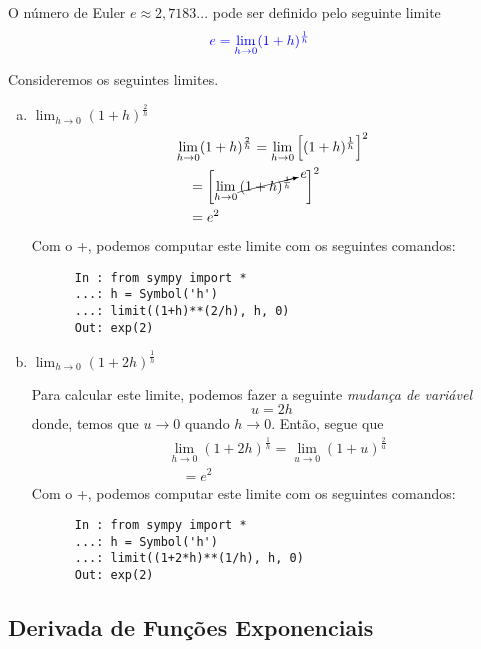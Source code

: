 O número de Euler $e\approx 2,7183...$ pode ser definido pelo seguinte limite
\begin{equation}\label{eq:defe}
  {\color{blue} e = \lim_{h\to 0}(1 + h)^{\frac{1}{h}}}
\end{equation}

\begin{ex}
  Consideremos os seguintes limites.
  \begin{enumerate}[a)]
  \item $\displaystyle\lim_{h\to 0} (1 + h)^{\frac{2}{h}}$
    \begin{align}
      & \lim_{h\to 0} (1 + h)^{\frac{2}{h}} = \lim_{h\to 0} \left[(1 + h)^{\frac{1}{h}}\right]^2\\
      & \text{}\quad = \left[\lim_{h\to 0}\cancelto{e}{(1 + h)^{\frac{1}{h}}}\quad\right]^2\\
      & \text{}\quad = e^2
    \end{align}
    \ifispython
    Com o {\python}+{\sympy}, podemos computar este limite com os seguintes comandos:
    \begin{lstlisting}
      In : from sympy import *
      ...: h = Symbol('h')
      ...: limit((1+h)**(2/h), h, 0)
      Out: exp(2)
    \end{lstlisting}
    \fi
  \item $\displaystyle \lim_{h\to 0}\left(1 + 2h\right)^{\frac{1}{h}}$
    
    Para calcular este limite, podemos fazer a seguinte \emph{mudança de variável}
    \begin{equation}
      u = 2h
    \end{equation}
    donde, temos que $u\to 0$ quando $h\to 0$. Então, segue que
    \begin{align}
      & \lim_{h\to 0}\left(1 + 2h\right)^{\frac{1}{h}} = \lim_{u\to 0}\left(1 + u\right)^{\frac{2}{u}}\\
      & \text{}\quad = e^2
    \end{align}
    \ifispython
    Com o {\python}+{\sympy}, podemos computar este limite com os seguintes comandos:
    \begin{lstlisting}
      In : from sympy import *
      ...: h = Symbol('h')
      ...: limit((1+2*h)**(1/h), h, 0)
      Out: exp(2)
    \end{lstlisting}
    \fi
  \end{enumerate}
\end{ex}

\subsection{Derivada de Funções Exponenciais}\label{cap_deriv_sec_funexplog:ssec:dexp}

